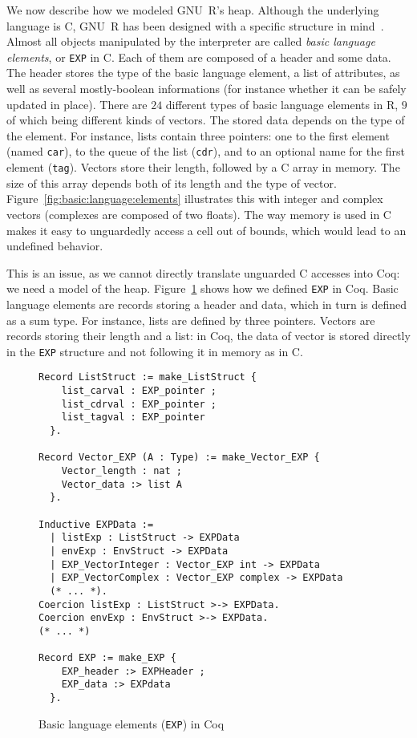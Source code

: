 \documentclass[
    sigplan,
    10pt,
    review, %
    natbib=false %
 ]{acmart}
\begin{document}
We now describe how we modeled GNU~R's heap.
Although the underlying language is C,
GNU~R has been designed with a specific structure in mind~\parencite{R}.
Almost all objects manipulated by the interpreter
are called \emph{basic language elements},
or \texttt{EXP} in C.
Each of them are composed of a header and some data.
%
The header stores the type of the basic language element,
a list of attributes,
as well as several mostly-boolean informations
(for instance whether it can be safely updated in place).
There are \(24\) different types of basic language elements in R,
\(9\) of which being different kinds of vectors.
%
The stored data depends on the type of the element.
For instance, lists contain three pointers:
one to the first element (named \texttt{car}),
to the queue of the list (\texttt{cdr}),
and to an optional name for the first element (\texttt{tag}).
Vectors store their length,
followed by a C array in memory.
The size of this array depends both of its length
and the type of vector.
Figure~\ref{fig:basic:language:elements} illustrates this
with integer and complex vectors
(complexes are composed of two floats).
%
The way memory is used in C
makes it easy to unguardedly access a cell out of bounds,
which would lead to an undefined behavior.



This is an issue,
as we cannot directly translate unguarded C accesses into Coq:
we need a model of the heap.
Figure~\ref{fig:EXP} shows how we defined \texttt{EXP} in Coq.
Basic language elements are records storing a header
and data,
which in turn is defined as a sum type.
For instance, lists are defined by three pointers.
Vectors are records storing their length and a list:
in Coq, the data of vector is stored directly in the \texttt{EXP} structure
and not following it in memory as in C.

\begin{figure}
\begin{verbatim}
Record ListStruct := make_ListStruct {
    list_carval : EXP_pointer ;
    list_cdrval : EXP_pointer ;
    list_tagval : EXP_pointer
  }.

Record Vector_EXP (A : Type) := make_Vector_EXP {
    Vector_length : nat ;
    Vector_data :> list A
  }.

Inductive EXPData :=
  | listExp : ListStruct -> EXPData
  | envExp : EnvStruct -> EXPData
  | EXP_VectorInteger : Vector_EXP int -> EXPData
  | EXP_VectorComplex : Vector_EXP complex -> EXPData
  (* ... *).
Coercion listExp : ListStruct >-> EXPData.
Coercion envExp : EnvStruct >-> EXPData.
(* ... *)

Record EXP := make_EXP {
    EXP_header :> EXPHeader ;
    EXP_data :> EXPdata
  }.
\end{verbatim}
    \caption{Basic language elements (\texttt{EXP}) in Coq}
    \label{fig:EXP}
\end{figure}
\end{document}

